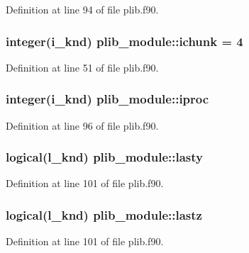 Definition at line 94 of file plib.\-f90.

\hypertarget{classplib__module_a0982ec611aac37b53db96a8266ff5c48}{
\subsubsection[{ichunk}]{\setlength{\rightskip}{0pt plus 5cm}integer(i\-\_\-knd) plib\-\_\-module\-::ichunk = 4}}\label{classplib__module_a0982ec611aac37b53db96a8266ff5c48}


Definition at line 51 of file plib.\-f90.

\hypertarget{classplib__module_a20a10200b84fc53b3f9703d080eb4f41}{
\subsubsection[{iproc}]{\setlength{\rightskip}{0pt plus 5cm}integer(i\-\_\-knd) plib\-\_\-module\-::iproc}}\label{classplib__module_a20a10200b84fc53b3f9703d080eb4f41}


Definition at line 96 of file plib.\-f90.

\hypertarget{classplib__module_ac8204e5b33211c1fe40e991a11d63f95}{
\subsubsection[{lasty}]{\setlength{\rightskip}{0pt plus 5cm}logical(l\-\_\-knd) plib\-\_\-module\-::lasty}}\label{classplib__module_ac8204e5b33211c1fe40e991a11d63f95}


Definition at line 101 of file plib.\-f90.

\hypertarget{classplib__module_a5d6addca95cdb6299949d278355bed3b}{
\subsubsection[{lastz}]{\setlength{\rightskip}{0pt plus 5cm}logical(l\-\_\-knd) plib\-\_\-module\-::lastz}}\label{classplib__module_a5d6addca95cdb6299949d278355bed3b}


Definition at line 101 of file plib.\-f90.

